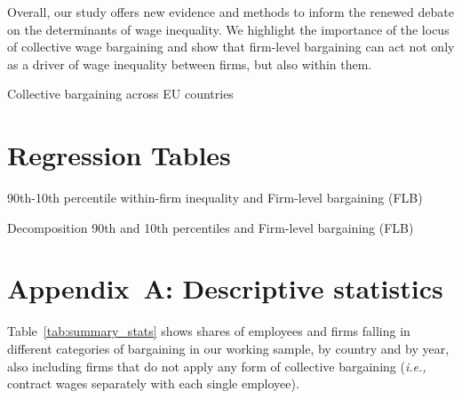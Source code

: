 \documentclass[12pt]{article}
\begin{document}
Overall, our study offers new evidence and methods to inform the renewed debate on the determinants of wage inequality. We highlight the importance of the locus of collective wage bargaining and show that firm-level bargaining can act not only as a driver of wage inequality between firms, but also within them.


\clearpage

\clearpage
\singlespacing


\clearpage

\begin{landscape}
\centering
\begin{table}[htb]
\caption{Collective bargaining across EU countries}
\label{tab:CBTable}
\centering

\end{table}
\end{landscape}

\section*{Regression Tables}
\label{sec:tables}


\begin{table}[hbt]
\caption{90th-10th percentile within-firm inequality and Firm-level bargaining (FLB)}
\label{tab:disp_90_10}

\end{table}

\clearpage


\begin{landscape}
\centering
\begin{table}[htb]
\caption{Decomposition 90th and 10th percentiles and Firm-level bargaining (FLB)}
\label{tab:disp_avg_90_10}
\centering

\end{table}
\end{landscape}

\appendix


\section*{Appendix~A: Descriptive statistics}
\label{sec:appendix_desc}
\setcounter{table}{0}
\renewcommand{\thetable}{A\arabic{table}}

Table~\ref{tab:summary_stats} shows shares of employees and firms falling in different categories of bargaining in our working sample, by country and by year, also including firms that do not apply any form of collective bargaining (\emph{i.e.,} contract wages separately with each single employee).
\end{document}
